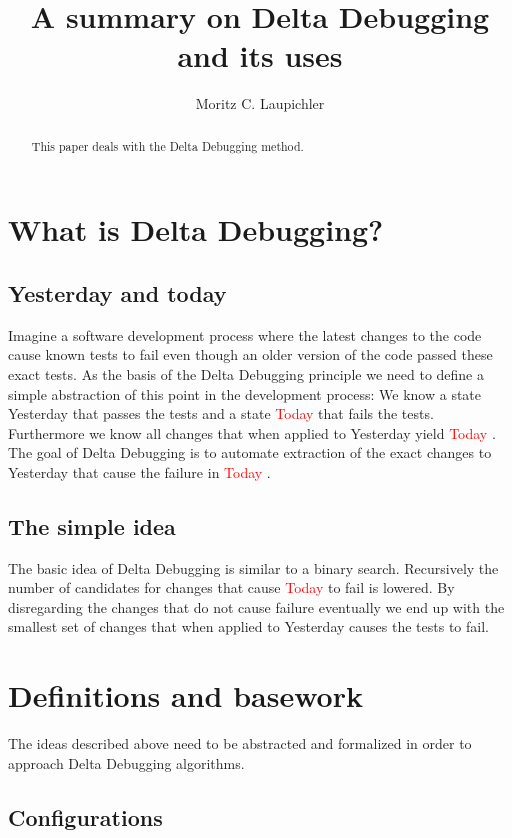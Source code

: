 \documentclass[a4paper,UKenglish]{lipics-v2018}
\title{A summary on Delta Debugging and its uses}
\author{Moritz C. Laupichler}{Fakultät für Informatik, Karlsruhe Institute of Technology, Germany}{moritz.laupichler@student.kit.edu}{}{}
\newcommand{\green}[1]{\textcolor{td-green}{#1}}
\newcommand{\red}[1]{\textcolor{red}{#1}}
\newcommand{\yd}[0]{\green{Yesterday} }
\newcommand{\td}[0]{\red{Today} }
\begin{document}
\maketitle

\begin{abstract}
	This paper deals with the Delta Debugging method.
\end{abstract}
	
\section{What is Delta Debugging?}

\subsection{Yesterday and today}
\label{ydandtd}

Imagine a software development process where the latest changes to the code cause known tests to fail even though an older version of the code passed these exact tests. As the basis of the Delta Debugging principle we need to define a simple abstraction of this point in the development process: We know a state \yd that passes the tests and a state \td that fails the tests. Furthermore we know all changes that when applied to \yd yield \td. \\
The goal of Delta Debugging is to automate extraction of the exact changes to \yd that cause the failure in \td.  

\subsection{The simple idea}
\label{ddidea}

The basic idea of Delta Debugging is similar to a binary search. Recursively the number of candidates for changes that cause \td to fail is lowered. By disregarding the changes that do not cause failure eventually we end up with the smallest set of changes that when applied to \yd causes the tests to fail. 



\section{Definitions and basework}

The ideas described above need to be abstracted and formalized in order to approach Delta Debugging algorithms.

\subsection{Configurations}
\end{document}
